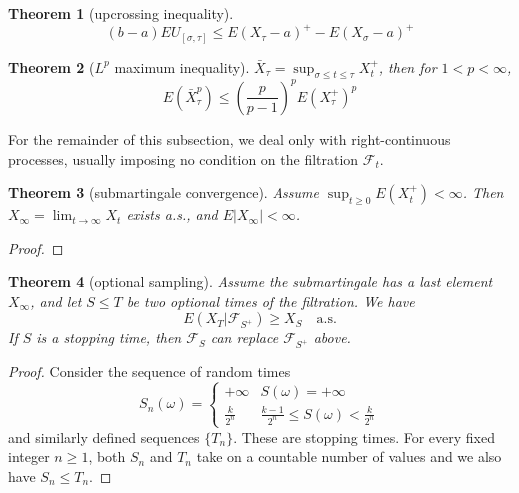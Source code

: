 \documentclass{article}
\newtheorem{Thm}{Theorem}[section]
\theoremstyle{definition}
\renewcommand{\leq}{\leqslant}
\renewcommand{\geq}{\geqslant}
\newcommand{\<}{\left\langle}
\renewcommand{\>}{\right\rangle}
\begin{document}
\begin{Thm}[upcrossing inequality]
    \[(b-a)EU_{[\sigma,\tau]}\leq E(X_\tau-a)^+-E(X_\sigma-a)^+\]
\end{Thm}

\begin{Thm}[$L^p$ maximum inequality]
    $\bar{X}_\tau= \sup_{\sigma\leq t\leq \tau}X_t^+$, then for $1<p<\infty$, \[E(\bar{X}_\tau^p)\leq (\frac{p}{p-1})^pE(X_\tau^+)^p\]
\end{Thm}



For the remainder of this subsection, we deal only with right-continuous processes,
usually imposing no condition on the filtration $\mathcal{F}_t$.
\begin{Thm}[submartingale convergence]
    Assume $\sup_{t\geq 0} E(X_t^+)<\infty$. Then $X_\infty =\lim_{t\to\infty} X_t$ exists a.s., and $E|X_\infty|<\infty$.
\end{Thm}
\begin{proof}
    
\end{proof}

\begin{Thm}[optional sampling]
    Assume the submartingale has a last element $X_\infty$,
    and let $S\leq T$ be two optional times of the filtration. We have 
    \[ E(X_T|\mathcal{F}_{S^+})\geq X_S \quad \text{a.s.}\] 
    If $S$ is a stopping time, then $\mathcal{F}_S$ can replace $\mathcal{F}_{S^+}$ above.
\end{Thm}
\begin{proof}
    Consider the sequence of random times 
    \[S_n(\omega)=\left\{\begin{matrix}
        +\infty   & S(\omega )=+\infty \\
        \frac{k}{2^n}   & \frac{k-1}{2^n} \leq S(\omega )<\frac{k}{2^n} 
        \end{matrix}\right. \]
    and similarly defined sequences $\{T_n\}$. These are stopping times.
    For every fixed integer $n\geq 1$, both $S_n$ and $T_n$ take on a countable number of values and we also have $S_n\leq T_n$.
\end{proof}
\end{document}
